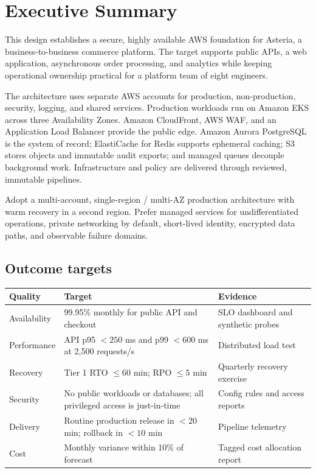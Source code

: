 \section{Executive Summary}

This design establishes a secure, highly available AWS foundation for Asteria, a business-to-business commerce platform. The target supports public APIs, a web application, asynchronous order processing, and analytics while keeping operational ownership practical for a platform team of eight engineers.

The architecture uses separate AWS accounts for production, non-production, security, logging, and shared services. Production workloads run on Amazon EKS across three Availability Zones. Amazon CloudFront, AWS WAF, and an Application Load Balancer provide the public edge. Amazon Aurora PostgreSQL is the system of record; ElastiCache for Redis supports ephemeral caching; S3 stores objects and immutable audit exports; and managed queues decouple background work. Infrastructure and policy are delivered through reviewed, immutable pipelines.

\begin{summarybox}
Adopt a multi-account, single-region / multi-AZ production architecture with warm recovery in a second region. Prefer managed services for undifferentiated operations, private networking by default, short-lived identity, encrypted data paths, and observable failure domains.
\end{summarybox}

\subsection{Outcome targets}

\begin{tabularx}{\textwidth}{@{}L{40mm}Y L{42mm}@{}}
  \toprule
  \color{white}\textbf{Quality} & \color{white}\textbf{Target} & \color{white}\textbf{Evidence} \\
  \midrule
  Availability & 99.95\% monthly for public API and checkout & SLO dashboard and synthetic probes \\
  Performance & API p95 $<250$ ms and p99 $<600$ ms at 2,500 requests/s & Distributed load test \\
  Recovery & Tier 1 RTO $\leq60$ min; RPO $\leq5$ min & Quarterly recovery exercise \\
  Security & No public workloads or databases; all privileged access is just-in-time & Config rules and access reports \\
  Delivery & Routine production release in $<20$ min; rollback in $<10$ min & Pipeline telemetry \\
  Cost & Monthly variance within 10\% of forecast & Tagged cost allocation report \\
  \bottomrule
\end{tabularx}

